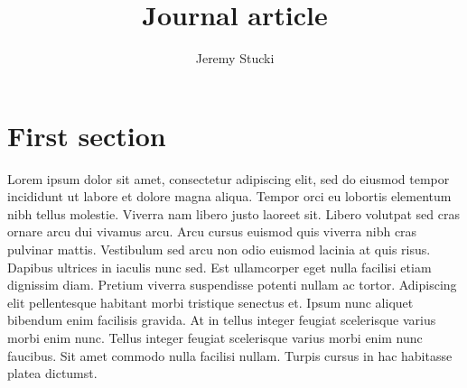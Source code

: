 \documentclass[twocolumn]{journal}
\title{Journal article}
\author{Jeremy Stucki}
\begin{document}
\maketitle

\section{First section}
Lorem ipsum dolor sit amet, consectetur adipiscing elit, sed do eiusmod tempor incididunt ut labore et dolore magna aliqua. Tempor orci eu lobortis elementum nibh tellus molestie. Viverra nam libero justo laoreet sit. Libero volutpat sed cras ornare arcu dui vivamus arcu. Arcu cursus euismod quis viverra nibh cras pulvinar mattis. Vestibulum sed arcu non odio euismod lacinia at quis risus. Dapibus ultrices in iaculis nunc sed. Est ullamcorper eget nulla facilisi etiam dignissim diam. Pretium viverra suspendisse potenti nullam ac tortor. Adipiscing elit pellentesque habitant morbi tristique senectus et. Ipsum nunc aliquet bibendum enim facilisis gravida. At in tellus integer feugiat scelerisque varius morbi enim nunc. Tellus integer feugiat scelerisque varius morbi enim nunc faucibus. Sit amet commodo nulla facilisi nullam. Turpis cursus in hac habitasse platea dictumst.
\end{document}
